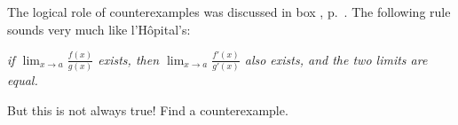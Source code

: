 The logical role of counterexamples was discussed in box
, p.~\pageref{fig:proof-not-by-example}.
The following rule sounds very much
like l'H\^{o}pital's:
\begin{center}
  \itshape if $\displaystyle\lim_{x\to a} \frac{f(x)} {g(x)}$ exists,
  then $\displaystyle\lim_{x\to a} \frac{f'(x)} {g'(x)}$ also exists,
  and the two limits are equal.
\end{center}
But this is not always true!  Find a counterexample.
